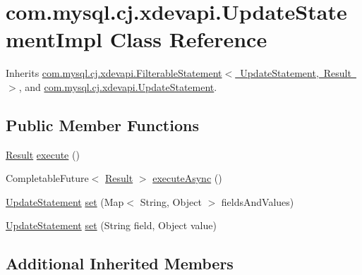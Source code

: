\hypertarget{classcom_1_1mysql_1_1cj_1_1xdevapi_1_1_update_statement_impl}{}\section{com.\+mysql.\+cj.\+xdevapi.\+Update\+Statement\+Impl Class Reference}
\label{classcom_1_1mysql_1_1cj_1_1xdevapi_1_1_update_statement_impl}


Inherits \mbox{\hyperlink{classcom_1_1mysql_1_1cj_1_1xdevapi_1_1_filterable_statement}{com.\+mysql.\+cj.\+xdevapi.\+Filterable\+Statement$<$ Update\+Statement, Result $>$}}, and \mbox{\hyperlink{interfacecom_1_1mysql_1_1cj_1_1xdevapi_1_1_update_statement}{com.\+mysql.\+cj.\+xdevapi.\+Update\+Statement}}.

\subsection*{Public Member Functions}
\begin{DoxyCompactItemize}
\item 
\mbox{\hyperlink{interfacecom_1_1mysql_1_1cj_1_1xdevapi_1_1_result}{Result}} \mbox{\hyperlink{classcom_1_1mysql_1_1cj_1_1xdevapi_1_1_update_statement_impl_a788b498a7eaccac3a60041232221b24a}{execute}} ()
\item 
Completable\+Future$<$ \mbox{\hyperlink{interfacecom_1_1mysql_1_1cj_1_1xdevapi_1_1_result}{Result}} $>$ \mbox{\hyperlink{classcom_1_1mysql_1_1cj_1_1xdevapi_1_1_update_statement_impl_abf6e7151f999adf63e8302a46f389887}{execute\+Async}} ()
\item 
\mbox{\hyperlink{interfacecom_1_1mysql_1_1cj_1_1xdevapi_1_1_update_statement}{Update\+Statement}} \mbox{\hyperlink{classcom_1_1mysql_1_1cj_1_1xdevapi_1_1_update_statement_impl_ad3e9fc6db7805042b6f73938782c2173}{set}} (Map$<$ String, Object $>$ fields\+And\+Values)
\item 
\mbox{\hyperlink{interfacecom_1_1mysql_1_1cj_1_1xdevapi_1_1_update_statement}{Update\+Statement}} \mbox{\hyperlink{classcom_1_1mysql_1_1cj_1_1xdevapi_1_1_update_statement_impl_a6100d1574e2958c9aa1229e70a476e37}{set}} (String field, Object value)
\end{DoxyCompactItemize}
\subsection*{Additional Inherited Members}


